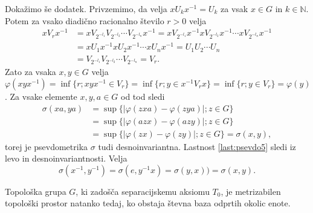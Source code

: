 \documentclass[mat1]{fmfdelo}
\newcommand{\N}{\mathbb N}
\begin{document}
\begin{dokaz}
Dokažimo še dodatek. Privzemimo, da velja $xU_kx^{-1} = U_k$ za vsak $x \in G$ in $k \in \N$. Potem za vsako diadično racionalno število $r > 0$ velja
\begin{align*}
xV_rx^{-1} &= xV_{2^{-l_1}}V_{2^{-l_2}}\cdots V_{2^{-l_n}}x^{-1} = xV_{2^{-l_1}}x^{-1}xV_{2^{-l_2}}x^{-1}\cdots xV_{2^{-l_n}}x^{-1} \\
&= xU_1x^{-1}xU_2x^{-1}\cdots xU_nx^{-1} = U_1U_2\cdots U_n \\ 
&= V_{2^{-l_1}}V_{2^{-l_2}}\cdots V_{2^{-l_n}} = V_r.
\end{align*}
Zato za vsaka $x, y \in G$ velja $\varphi(xyx^{-1}) = \inf\lbrace r ; xyx^{-1} \in V_r \rbrace = \inf\lbrace r ; y \in x^{-1}V_rx \rbrace = \inf\lbrace r ; y \in V_r \rbrace = \varphi(y)$.
Za vsake elemente $x, y, a \in G$ od tod sledi
\begin{align*}
\sigma(xa, ya) &= \sup\lbrace |\varphi(zxa) - \varphi(zya)| ; z \in G \rbrace \\
&= \sup\lbrace |\varphi(azx) - \varphi(azy)| ; z \in G \rbrace \\
&= \sup\lbrace |\varphi(zx) - \varphi(zy)| ; z \in G \rbrace = \sigma(x, y),
\end{align*}
torej je psevdometrika $\sigma$ tudi desnoinvariantna.
Lastnost \ref{last:psevdo5} sledi iz levo in desnoinvariantnosti. Velja
\[ \sigma(x^{-1}, y^{-1}) = \sigma(e, y^{-1}x) = \sigma(y, x) ) = \sigma(x, y). \]
\end{dokaz}

\begin{izrek}\label{izr:metrizabilnost}
	Topološka grupa $G$, ki zadošča separacijskemu aksiomu $T_0$, je me\-tri\-za\-bi\-len topološki prostor natanko tedaj, ko obstaja števna baza odprtih okolic enote.
\end{izrek}
\end{document}
